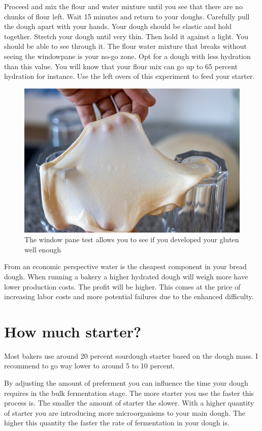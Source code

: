 Proceed and mix the flour and water mixture until you see that there
are no chunks of flour left. Wait 15 minutes and return to your doughs.
Carefully pull the dough apart with your hands. Your dough should be elastic
and hold together. Stretch your dough until very thin. Then hold it against a light.
You should be able to see through it. The flour water mixture that breaks without
seeing the windowpane is your no-go zone. Opt for a dough with
less hydration than this value. You will know that your flour mix can go up to
65 percent hydration for instance. Use the left overs of this experiment
to feed your starter.


\begin{figure}[!htb]
  \includegraphics[width=\textwidth]{window-pane-effect}
  \caption
    {The window pane test allows you to see if you developed your gluten well enough}
\end{figure}


From an economic perspective water is the cheapest component in your bread
dough. When running a bakery a higher hydrated dough will weigh more have
lower production costs. The profit will be higher. This comes at the price
of increasing labor costs and more potential failures due to the enhanced
difficulty.

\section{How much starter?}

Most bakers use around 20 percent sourdough starter based on the dough mass. I
recommend to go way lower to around 5 to 10 percent.

By adjusting the amount of preferment you can influence the time your dough
requires in the bulk fermentation stage. The more starter you use the faster
this process is. The smaller the amount of starter the slower. With a higher
quantity of starter you are introducing more microorganisms to your main
dough. The higher this quantity the faster the rate of fermentation in your
dough is.

